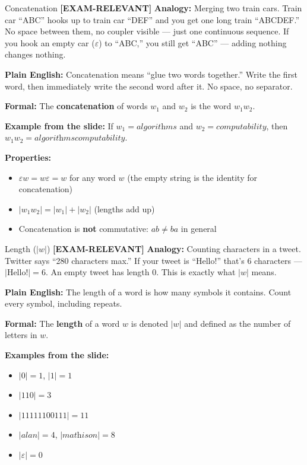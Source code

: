 \documentclass[11pt,a4paper]{article}
\newcommand{\kemark}{\textcolor{red!70!black}{\textbf{[EXAM-RELEVANT]}}}
\begin{document}
\begin{definitionbox}{Concatenation \kemark}
\textbf{Analogy:} Merging two train cars. Train car ``ABC'' hooks up to train car ``DEF'' and you get one long train ``ABCDEF.'' No space between them, no coupler visible --- just one continuous sequence. If you hook an empty car ($\varepsilon$) to ``ABC,'' you still get ``ABC'' --- adding nothing changes nothing.

\textbf{Plain English:} Concatenation means ``glue two words together.'' Write the first word, then immediately write the second word after it. No space, no separator.

\textbf{Formal:} The \textbf{concatenation} of words $w_1$ and $w_2$ is the word $w_1 w_2$.

\textbf{Example from the slide:}
If $w_1 = \textit{algorithms}$ and $w_2 = \textit{computability}$, then $w_1 w_2 = \textit{algorithmscomputability}$.

\textbf{Properties:}
\begin{itemize}[nosep]
\item $\varepsilon w = w\varepsilon = w$ for any word $w$ (the empty string is the identity for concatenation)
\item $|w_1 w_2| = |w_1| + |w_2|$ (lengths add up)
\item Concatenation is \textbf{not} commutative: $ab \neq ba$ in general
\end{itemize}
\end{definitionbox}

\begin{definitionbox}{Length ($|w|$) \kemark}
\textbf{Analogy:} Counting characters in a tweet. Twitter says ``280 characters max.'' If your tweet is ``Hello!'' that's 6 characters --- $|$Hello!$| = 6$. An empty tweet has length 0. This is exactly what $|w|$ means.

\textbf{Plain English:} The length of a word is how many symbols it contains. Count every symbol, including repeats.

\textbf{Formal:} The \textbf{length} of a word $w$ is denoted $|w|$ and defined as the number of letters in $w$.

\textbf{Examples from the slide:}
\begin{itemize}[nosep]
\item $|0| = 1$, \quad $|1| = 1$
\item $|110| = 3$
\item $|11111100111| = 11$
\item $|\textit{alan}| = 4$, \quad $|\textit{mathison}| = 8$
\item $|\varepsilon| = 0$
\end{itemize}
\end{definitionbox}
\end{document}
